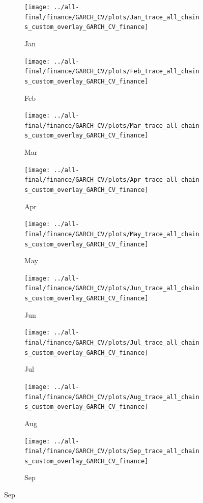 \documentclass[ngerman]{ttlab-qualify}
\begin{document}
\newpage
\begin{figure}[H]
\centering
  \begin{subfigure}{.3\linewidth}
  \texttt{[image: ../all-final/finance/GARCH\_CV/plots/Jan\_trace\_all\_chains\_custom\_overlay\_GARCH\_CV\_finance]}\hfill
  \caption{Jan}
  \end{subfigure}
  \begin{subfigure}{.3\linewidth}
  \texttt{[image: ../all-final/finance/GARCH\_CV/plots/Feb\_trace\_all\_chains\_custom\_overlay\_GARCH\_CV\_finance]}\hfill
  \caption{Feb}
  \end{subfigure}
  \begin{subfigure}{.3\linewidth}
  \texttt{[image: ../all-final/finance/GARCH\_CV/plots/Mar\_trace\_all\_chains\_custom\_overlay\_GARCH\_CV\_finance]}\hfill
  \caption{Mar}
  \end{subfigure}\par\medskip
  \begin{subfigure}{.3\linewidth}
  \texttt{[image: ../all-final/finance/GARCH\_CV/plots/Apr\_trace\_all\_chains\_custom\_overlay\_GARCH\_CV\_finance]}\hfill
  \caption{Apr}
  \end{subfigure}
  \begin{subfigure}{.3\linewidth}
  \texttt{[image: ../all-final/finance/GARCH\_CV/plots/May\_trace\_all\_chains\_custom\_overlay\_GARCH\_CV\_finance]}\hfill
  \caption{May}
  \end{subfigure}
  \begin{subfigure}{.3\linewidth}
  \texttt{[image: ../all-final/finance/GARCH\_CV/plots/Jun\_trace\_all\_chains\_custom\_overlay\_GARCH\_CV\_finance]}\hfill
  \caption{Jun}
  \end{subfigure}\par\medskip
  \begin{subfigure}{.3\linewidth}
  \texttt{[image: ../all-final/finance/GARCH\_CV/plots/Jul\_trace\_all\_chains\_custom\_overlay\_GARCH\_CV\_finance]}\hfill
  \caption{Jul}
  \end{subfigure}
  \begin{subfigure}{.3\linewidth}
  \texttt{[image: ../all-final/finance/GARCH\_CV/plots/Aug\_trace\_all\_chains\_custom\_overlay\_GARCH\_CV\_finance]}\hfill
  \caption{Aug}
  \end{subfigure}
  \begin{subfigure}{.3\linewidth}
  \texttt{[image: ../all-final/finance/GARCH\_CV/plots/Sep\_trace\_all\_chains\_custom\_overlay\_GARCH\_CV\_finance]}\hfill
  \caption{Sep}
  \end{subfigure}\par\medskip

\end{figure}
\end{document}
